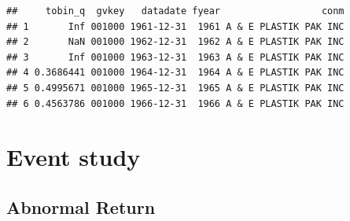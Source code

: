 \documentclass[
]{book}
\newenvironment{Shaded}{\begin{snugshade}}{\end{snugshade}}
\newcommand{\CommentTok}[1]{\textcolor[rgb]{0.56,0.35,0.01}{\textit{#1}}}
\newcommand{\DataTypeTok}[1]{\textcolor[rgb]{0.13,0.29,0.53}{#1}}
\newcommand{\DecValTok}[1]{\textcolor[rgb]{0.00,0.00,0.81}{#1}}
\newcommand{\KeywordTok}[1]{\textcolor[rgb]{0.13,0.29,0.53}{\textbf{#1}}}
\newcommand{\NormalTok}[1]{#1}
\newcommand{\OperatorTok}[1]{\textcolor[rgb]{0.81,0.36,0.00}{\textbf{#1}}}
\newcommand{\StringTok}[1]{\textcolor[rgb]{0.31,0.60,0.02}{#1}}
\begin{document}
\begin{Shaded}
\end{Shaded}

\begin{verbatim}
##     tobin_q  gvkey   datadate fyear                  conm
## 1       Inf 001000 1961-12-31  1961 A & E PLASTIK PAK INC
## 2       NaN 001000 1962-12-31  1962 A & E PLASTIK PAK INC
## 3       Inf 001000 1963-12-31  1963 A & E PLASTIK PAK INC
## 4 0.3686441 001000 1964-12-31  1964 A & E PLASTIK PAK INC
## 5 0.4995671 001000 1965-12-31  1965 A & E PLASTIK PAK INC
## 6 0.4563786 001000 1966-12-31  1966 A & E PLASTIK PAK INC
\end{verbatim}

\hypertarget{event-study}{%
\section{Event study}\label{event-study}}

\hypertarget{abnormal-return}{%
\subsection{Abnormal Return}\label{abnormal-return}}
\end{document}
